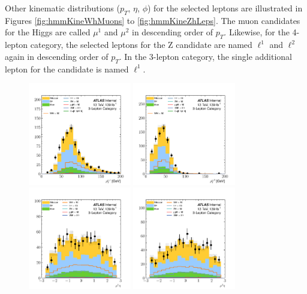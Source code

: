     
Other kinematic distributions ($p_T$, $\eta$, $\phi$) for the selected leptons are illustrated in Figures \ref{fig:hmmKineWhMuons} to \ref{fig:hmmKineZhLeps}.
The muon candidates for the Higgs are called $\mu^1$ and $\mu^2$ in descending order of $p_T$. 
Likewise, for the 4-lepton category, the selected leptons for the Z candidate are named $\ell^1$ and $\ell^2$ again in descending order of $p_T$.
In the 3-lepton category, the single additional lepton for the \W candidate is named $\ell^1$.




\clearpage
\begin{figure}[htpb]
  \centering
  \includegraphics[width=0.4\textwidth]{figures/hmm/kinematics/histo-3lep-u1_pt.pdf}
  \includegraphics[width=0.4\textwidth]{figures/hmm/kinematics/histo-3lep-u2_pt.pdf}
  \includegraphics[width=0.4\textwidth]{figures/hmm/kinematics/histo-3lep-u1_eta.pdf}
  \includegraphics[width=0.4\textwidth]{figures/hmm/kinematics/histo-3lep-u2_eta.pdf}

\end{figure}
